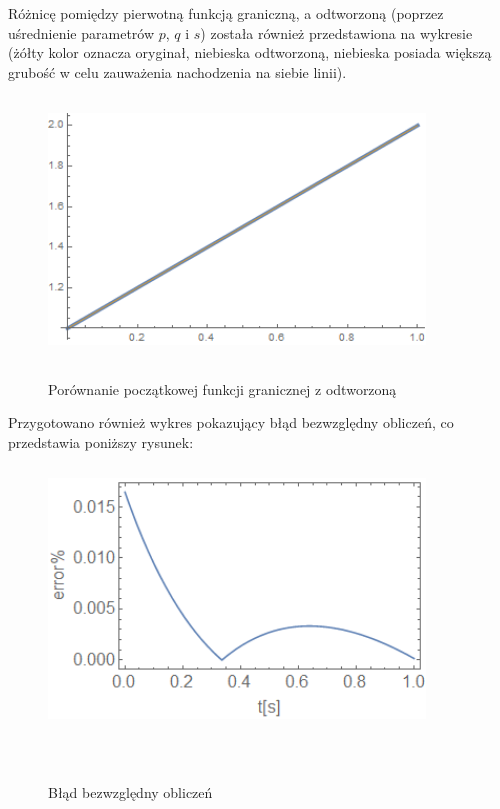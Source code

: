\documentclass[twoside]{projektInzynierskiMS1}
\newcommand{\si}{ś}
\begin{document}
Różnicę pomiędzy pierwotną funkcją graniczną, a odtworzoną (poprzez u\si rednienie parametrów $p$, $q$ i $s$) została również przedstawiona na wykresie (żółty kolor oznacza oryginał, niebieska odtworzoną, niebieska posiada większą grubo\si ć w celu zauważenia nachodzenia na siebie linii).

\begin{figure}[H]
\begin{center}
		\includegraphics[height=7cm, width=10cm]{pics/0reconstruction.png}\\
	\caption{Porównanie początkowej funkcji granicznej z odtworzoną}
\end{center}
\end{figure}

Przygotowano również wykres pokazujący błąd bezwzględny obliczeń, co przedstawia poniższy rysunek: \\

\begin{figure}[H]
\begin{center}
		\includegraphics[height=7cm, width=10cm]{pics/0abs.png}\\
	\caption{Błąd bezwzględny obliczeń}\
\end{center}
\end{figure}
\end{document}
